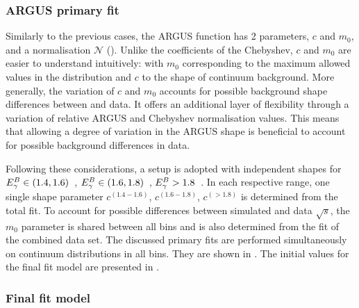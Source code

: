 \subsubsection{ARGUS primary fit}\label{sec:argus_prefit}

Similarly to the previous cases, the ARGUS function has 2 parameters, $c$ and $m_0$, and a normalisation $\mathcal{N}$ ().
Unlike the coefficients of the Chebyshev, $c$ and $m_0$ are easier to understand intuitively: with $m_0$ corresponding to the maximum allowed \Mbc values in the distribution and $c$ to the shape of continuum background.
More generally, the variation of $c$ and $m_0$ accounts for possible background shape differences between \MC and data.
It offers an additional layer of flexibility through a variation of relative ARGUS and Chebyshev normalisation values.
This means that allowing a degree of variation in the ARGUS shape is beneficial to account for possible background differences in data.

Following these considerations, a setup is adopted with independent shapes for  \mbox{${E^B_{\gamma}}\in(1.4,1.6)$~\gev}, \mbox{${E^B_{\gamma}}\in(1.6,1.8)$~\gev}, ${E^B_{\gamma}}>1.8$~\gev.
In each respective range, one single shape parameter $c^{(1.4-1.6)}$, $c^{(1.6-1.8)}$, $c^{(>1.8)}$ is determined from the total fit.
To account for possible differences between simulated and data $\sqrt{s}$, the $m_0$ parameter is shared between all bins and is also determined from the fit of the combined data set.
The discussed primary fits are performed simultaneously on continuum \Mbc distributions in all \EB bins.
They are shown in .
The initial values for the final \Mbc fit model are presented in .

\subsubsection{Final fit model}

